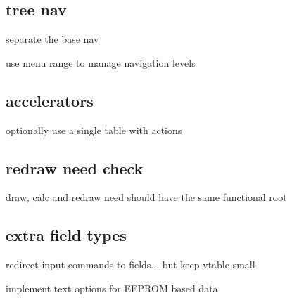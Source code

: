 \subsection*{tree nav}


\begin{DoxyItemize}
\item separate the base nav
\item use menu range to manage navigation levels
\end{DoxyItemize}

\subsection*{accelerators}


\begin{DoxyItemize}
\item optionally use a single table with actions
\end{DoxyItemize}

\subsection*{redraw need check}


\begin{DoxyItemize}
\item draw, calc and redraw need should have the same functional root
\end{DoxyItemize}

\subsection*{extra field types}


\begin{DoxyItemize}
\item redirect input commands to fields... but keep vtable small
\item implement text options for E\+E\+P\+R\+OM based data 
\end{DoxyItemize}